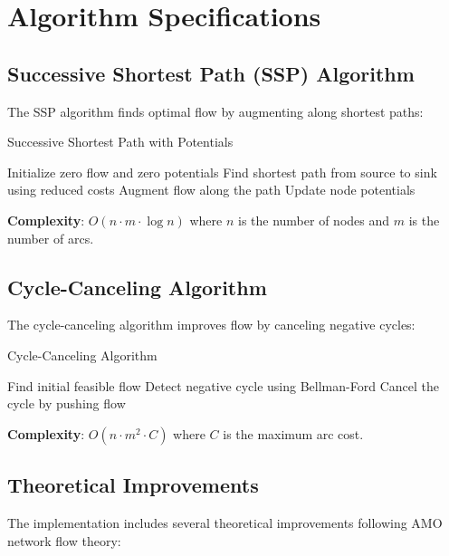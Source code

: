 \documentclass[12pt,a4paper]{article}
\begin{document}
\section{Algorithm Specifications}

\subsection{Successive Shortest Path (SSP) Algorithm}

The SSP algorithm finds optimal flow by augmenting along shortest paths:

\begin{algorithm}[H]
\caption{Successive Shortest Path with Potentials}
\begin{algorithmic}[1]
\STATE Initialize zero flow and zero potentials
    \STATE Find shortest path from source to sink using reduced costs
    \STATE Augment flow along the path
    \STATE Update node potentials
\ENDWHILE
\end{algorithmic}
\end{algorithm}

\textbf{Complexity}: $O(n \cdot m \cdot \log n)$ where $n$ is the number of nodes and $m$ is the number of arcs.

\subsection{Cycle-Canceling Algorithm}

The cycle-canceling algorithm improves flow by canceling negative cycles:

\begin{algorithm}[H]
\caption{Cycle-Canceling Algorithm}
\begin{algorithmic}[1]
\STATE Find initial feasible flow
    \STATE Detect negative cycle using Bellman-Ford
    \STATE Cancel the cycle by pushing flow
\ENDWHILE
\end{algorithmic}
\end{algorithm}

\textbf{Complexity}: $O(n \cdot m^2 \cdot C)$ where $C$ is the maximum arc cost.

\subsection{Theoretical Improvements}

The implementation includes several theoretical improvements following AMO network flow theory:
\end{document}
